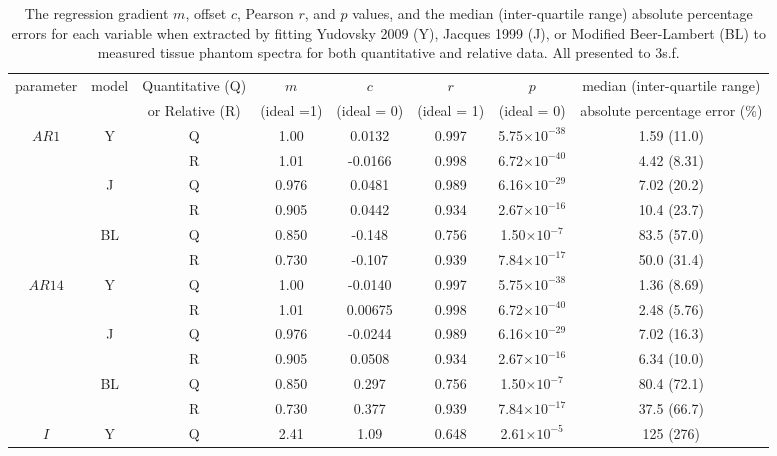 \begin{table}[htb!]
    \centering
    \caption{The regression gradient $m$, offset $c$, Pearson $r$, and $p$ values, and the median (inter-quartile range) absolute percentage errors for each variable when extracted by fitting Yudovsky 2009 (Y), Jacques 1999 (J), or Modified Beer-Lambert (BL) to measured tissue phantom spectra for both quantitative and relative data. All presented to 3s.f.}
    \begin{tabular}{|ccc|ccccc|}
        \hline
        parameter & model & Quantitative (Q) & $m$ & $c$ & $r$ & $p$ & median (inter-quartile range) \\
        & & or Relative (R) & (ideal =1) & (ideal = 0) & (ideal = 1) & (ideal = 0) & absolute percentage error (\%)\\
        \hline
        \multirow{6}{*}{$AR1$} & \multirow{2}{*}{Y} & Q & 1.00 & 0.0132 & 0.997 & 5.75$\times 10^{-38}$ & 1.59 (11.0) \\
        & & R & 1.01 & -0.0166 & 0.998 & 6.72$\times 10^{-40}$ & 4.42 (8.31) \\
        \cline{2-8}
        & \multirow{2}{*}{J} & Q & 0.976 & 0.0481 & 0.989 & 6.16$\times 10^{-29}$ & 7.02 (20.2) \\
        & & R & 0.905 & 0.0442 & 0.934 & 2.67$\times 10^{-16}$ & 10.4 (23.7) \\
        \cline{2-8}
        & \multirow{2}{*}{BL} & Q & 0.850 & -0.148 & 0.756 & 1.50$\times 10^{-7}$ & 83.5 (57.0) \\
        & & R & 0.730 & -0.107 & 0.939 & 7.84$\times 10^{-17}$ & 50.0 (31.4)\\
        \hline
        \multirow{6}{*}{$AR14$} & \multirow{2}{*}{Y} & Q & 1.00 & -0.0140 & 0.997 & 5.75$\times 10^{-38}$ & 1.36 (8.69) \\
        & & R & 1.01 & 0.00675 & 0.998 & 6.72$\times 10^{-40}$ & 2.48 (5.76) \\
        \cline{2-8}
        & \multirow{2}{*}{J} & Q & 0.976 & -0.0244 & 0.989 & 6.16$\times 10^{-29}$ & 7.02 (16.3) \\
        & & R & 0.905 & 0.0508 & 0.934 & 2.67$\times 10^{-16}$ & 6.34 (10.0) \\
        \cline{2-8}
        & \multirow{2}{*}{BL} & Q & 0.850 & 0.297 & 0.756 & 1.50$\times 10^{-7}$ & 80.4 (72.1) \\
        & & R & 0.730 & 0.377 & 0.939 & 7.84$\times 10^{-17}$ & 37.5 (66.7) \\
        \hline
        \multirow{6}{*}{$I$} & \multirow{2}{*}{Y} & Q & 2.41 & 1.09 & 0.648 & 2.61$\times 10^{-5}$ & 125 (276) \\

\end{tabular}
\end{table}
